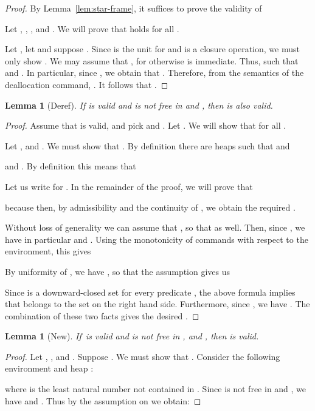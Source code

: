 \documentclass{LMCS}
\newtheorem{lemma}[theorem]{Lemma}
\theoremstyle{remark}
\begin{document}
\begin{figure*}[t]
\begin{proof}
By Lemma~\ref{lem:star-frame}, it suffices to prove the validity of

Let , , ,  and . 
We will prove that  holds for all . 

Let , let  and suppose . 
Since  is the unit for  and  is a closure operation, we must only show . 
We may assume that , for otherwise  is immediate. 
Thus,  such that  and . 
In particular, since , we obtain that . 
Therefore, from the semantics of the deallocation command, 
. It follows that . 
\end{proof}


\begin{lemma}[Deref] 
If  is valid and  is not free in  and , 
then  is also valid. 
\end{lemma}

\begin{proof}
Assume that  is valid, and pick  and . 
Let . 
We will show that  for all .

Let ,  and .  
We must show that . 
By definition there are heaps  such that  and 
 
and 
.  
By definition this means that

Let us write  for . In the remainder of the proof,
we will prove that

because then, by admissibility and the continuity of , we obtain 
the required
.

Without loss of generality we can assume that , so that 
as well.
Then, since , we have in particular  and . 
Using the monotonicity of commands with respect to the environment, this gives 

By uniformity of , we have 
, so that the assumption gives us 

Since  is a downward-closed set for every predicate , the above
formula implies that  belongs to the set on the right hand side.
Furthermore, since , we have . The combination
of these two facts
gives the desired .
\end{proof}


\begin{lemma}[New] 
If\  is valid and  is not free in ,  and , then 
 is valid. 
\end{lemma}

\begin{proof}
Let , ,  and . Suppose .  
We must show that . 
Consider the following environment  and heap :

where  is the least natural number not contained in . 
Since  is not free in  and , we have  and . Thus by the assumption on  we obtain:


\end{proof}
\end{figure*}
\end{document}
